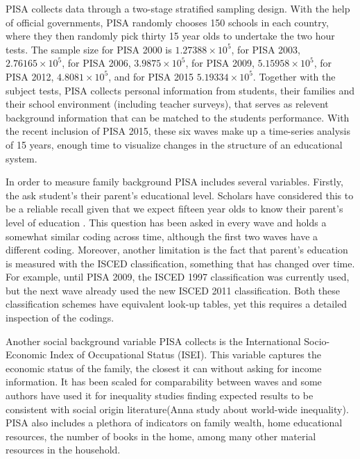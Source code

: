 \documentclass[11pt, a4paper]{article}\usepackage[]{graphicx}\usepackage[]{color}
\begin{document}
PISA collects data through a two-stage stratified sampling design. With the help of official governments, PISA randomly chooses 150 schools in each country, where they then randomly pick thirty 15 year olds to undertake the two hour tests. The sample size for PISA 2000 is \ensuremath{1.27388\times 10^{5}}, for PISA 2003, \ensuremath{2.76165\times 10^{5}}, for PISA 2006, \ensuremath{3.9875\times 10^{5}}, for PISA 2009, \ensuremath{5.15958\times 10^{5}}, for PISA 2012, \ensuremath{4.8081\times 10^{5}}, and for PISA 2015 \ensuremath{5.19334\times 10^{5}}. Together with the subject tests, PISA collects personal information from students, their families and their school environment (including teacher surveys), that serves as relevent background information that can be matched to the students performance. With the recent inclusion of PISA 2015, these six waves make up a time-series analysis of 15 years, enough time to visualize changes in the structure of an educational system.

In order to measure family background PISA includes several variables. Firstly, the ask student's their parent's educational level. Scholars have considered this to be a reliable recall given that we expect fifteen year olds to know their parent's level of education \citep{reardon2011}. This question has been asked in every wave and holds a somewhat similar coding across time, although the first two waves have a different coding. Moreover, another limitation is the fact that parent's education is measured with the ISCED classification, something that has changed over time. For example, until PISA 2009, the ISCED 1997 classification was currently used, but the next wave already used the new ISCED 2011 classification. Both these classification schemes have equivalent look-up tables, yet this requires a detailed inspection of the codings.

Another social background variable PISA collects is the International Socio-Economic Index of Occupational Status (ISEI). This variable captures the economic status of the family, the closest it can without asking for income information. It has been scaled for comparability between waves and some authors have used it for inequality studies finding expected results to be consistent with social origin literature(Anna study about world-wide inequality). PISA also includes a plethora of indicators on family wealth, home educational resources, the number of books in the home, among many other material resources in the household.
\end{document}
